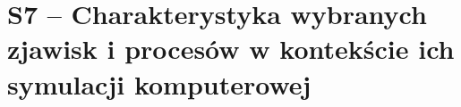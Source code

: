 \section{S7 -- Charakterystyka wybranych zjawisk i procesów w kontekście ich symulacji komputerowej}